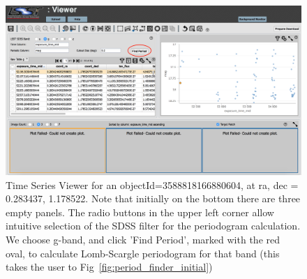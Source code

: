 \documentclass[DM,lsstdraft,toc]{lsstdoc}
\begin{document}
\begin{figure}
\includegraphics[width=\textwidth]{figs/PDAC_viewer_initial}
\caption{Time Series Viewer for an objectId=3588818166880604, at ra, dec = 0.283437\degree, 1.178522\degree . Note that initially on the bottom there are three empty panels. The radio buttons in the upper left corner allow  intuitive selection of the SDSS filter for the periodogram calculation. We choose g-band, and click 'Find Period', marked with the red oval, to calculate Lomb-Scargle periodogram for that band (this takes the user to Fig~\ref{fig:period_finder_initial}) }
\label{fig:time_series_viewer_initial}
\end{figure}
\end{document}
